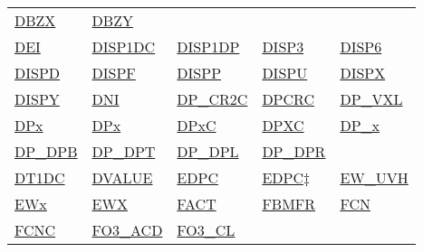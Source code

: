 \documentclass[
  english,
]{book}
\begin{document}
\begin{longtable}[]{@{}lllll@{}}
\href{./cloud-physics-variables.html\#DBZ}{DBZX} &
\href{./cloud-physics-variables.html\#DBZ}{DBZY} \\
\href{./the-state-of-the-aircraft.html\#dei-dni}{DEI} &
\href{./cloud-physics-variables.html\#disp2d}{DISP1DC} &
\href{./cloud-physics-variables.html\#disp2d}{DISP1DP} &
\href{./cloud-physics-variables.html\#dispersion}{DISP3} &
\href{./cloud-physics-variables.html\#dispersion}{DISP6} \\
\href{./cloud-physics-variables.html\#dispersion}{DISPD} &
\href{./cloud-physics-variables.html\#dispersion}{DISPF} &
\href{./cloud-physics-variables.html\#dispersion}{DISPP} &
\href{./cloud-physics-variables.html\#dispersion}{DISPU} &
\href{./cloud-physics-variables.html\#dispersion}{DISPX} \\
\href{./cloud-physics-variables.html\#dispersion}{DISPY} &
\href{./the-state-of-the-aircraft.html\#dei-dni}{DNI} &
\href{./the-state-of-the-atmosphere.html\#dp-cr2}{DP\_CR2C} &
\href{./obsolete-variables.html\#cryo-hygro}{DPCRC} &
\href{./the-state-of-the-atmosphere.html\#vcsel-dp}{DP\_VXL} \\
\href{./the-state-of-the-atmosphere.html\#dew-point}{DPx} &
\href{./the-state-of-the-atmosphere.html\#dew-point}{DPx} &
\href{./the-state-of-the-atmosphere.html\#dewpt-corrected}{DPxC} &
\href{./the-state-of-the-atmosphere.html\#dewpt-corrected}{DPXC} &
\href{./the-state-of-the-atmosphere.html\#dew-point}{DP\_x} \\
\href{./the-state-of-the-atmosphere.html\#dew-point}{DP\_DPB} &
\href{./the-state-of-the-atmosphere.html\#dew-point}{DP\_DPT} &
\href{./the-state-of-the-atmosphere.html\#dew-point}{DP\_DPL} &
\href{./the-state-of-the-atmosphere.html\#dew-point}{DP\_DPR} & \\
\href{./cloud-physics-variables.html\#dt1dc}{DT1DC} &
\href{./the-state-of-the-atmosphere.html\#dvalue}{DVALUE} &
\href{./the-state-of-the-atmosphere.html\#ewx}{EDPC} &
\href{./obsolete-variables.html\#edpc}{EDPC\(\ddagger\)} &
\href{./the-state-of-the-atmosphere.html\#ewx}{EW\_UVH} \\
\href{./the-state-of-the-atmosphere.html\#ewx}{EWx} &
\href{./the-state-of-the-atmosphere.html\#ewx}{EWX} &
\href{./obsolete-variables.html\#fact}{FACT} &
\href{./obsolete-variables.html\#fbmfr}{FBMFR} &
\href{./aerosol-particle-measurements.html\#fcnc}{FCN} \\
\href{./aerosol-particle-measurements.html\#fcnc}{FCNC} &
\href{./air-chemistry-measurements.html\#fo3-acd}{FO3\_ACD} &
\href{./air-chemistry-measurements.html\#fo3-acd}{FO3\_CL} &

\end{longtable}
\end{document}
